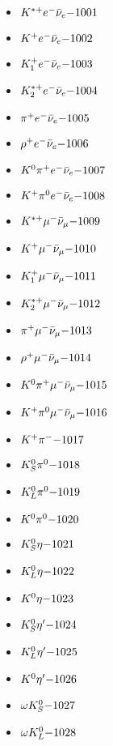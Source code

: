 
 \begin{multicols}{3} 
 \begin{itemize}
 \item $ K^{*+} e^{-} \bar{\nu}_{e} \hfill{-1001}$
 \item $ K^{+} e^{-} \bar{\nu}_{e} \hfill{-1002}$
 \item $ K_{1}^{+} e^{-} \bar{\nu}_{e} \hfill{-1003}$
 \item $ K_{2}^{*+} e^{-} \bar{\nu}_{e} \hfill{-1004}$
 \item $ \pi^{+} e^{-} \bar{\nu}_{e} \hfill{-1005}$
 \item $ \rho^{+} e^{-} \bar{\nu}_{e} \hfill{-1006}$
 \item $ K^{0} \pi^{+} e^{-} \bar{\nu}_{e} \hfill{-1007}$
 \item $ K^{+} \pi^{0} e^{-} \bar{\nu}_{e} \hfill{-1008}$
 \item $ K^{*+} \mu^{-} \bar{\nu}_{\mu} \hfill{-1009}$
 \item $ K^{+} \mu^{-} \bar{\nu}_{\mu} \hfill{-1010}$
 \item $ K_{1}^{+} \mu^{-} \bar{\nu}_{\mu} \hfill{-1011}$
 \item $ K_{2}^{*+} \mu^{-} \bar{\nu}_{\mu} \hfill{-1012}$
 \item $ \pi^{+} \mu^{-} \bar{\nu}_{\mu} \hfill{-1013}$
 \item $ \rho^{+} \mu^{-} \bar{\nu}_{\mu} \hfill{-1014}$
 \item $ K^{0} \pi^{+} \mu^{-} \bar{\nu}_{\mu} \hfill{-1015}$
 \item $ K^{+} \pi^{0} \mu^{-} \bar{\nu}_{\mu} \hfill{-1016}$
 \item $ K^{+} \pi^{-} \hfill{-1017}$
 \item $ K_{S}^{0} \pi^{0} \hfill{-1018}$
 \item $ K_{L}^{0} \pi^{0} \hfill{-1019}$
 \item $ K^{0} \pi^{0} \hfill{-1020}$
 \item $ K_{S}^{0} \eta \hfill{-1021}$
 \item $ K_{L}^{0} \eta \hfill{-1022}$
 \item $ K^{0} \eta \hfill{-1023}$
 \item $ K_{S}^{0} {\eta^{\prime}} \hfill{-1024}$
 \item $ K_{L}^{0} {\eta^{\prime}} \hfill{-1025}$
 \item $ K^{0} {\eta^{\prime}} \hfill{-1026}$
 \item $ \omega K_{S}^{0} \hfill{-1027}$
 \item $ \omega K_{L}^{0} \hfill{-1028}$

\end{itemize}
\end{multicols}
